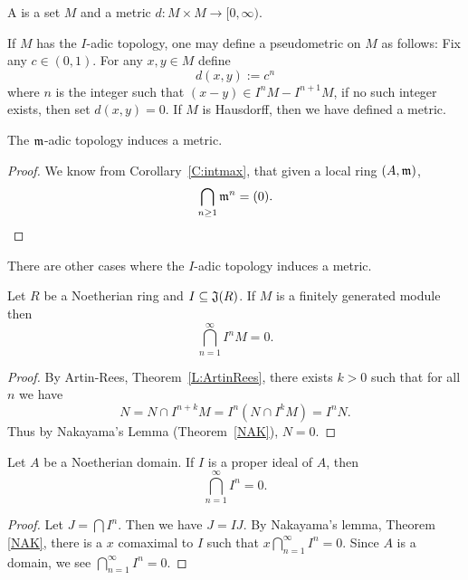 \documentclass{ximera}
\begin{document}
\begin{definition}
  A  is a set $M$ and a metric $d:M\times M \to
  [0,\infty)$.
\end{definition}

If $M$ has the $I$-adic topology, one may define a
pseudometric on $M$ as follows: Fix any $c\in
(0,1)$. For any $x,y\in M$ define
\[
d(x,y) := c^n
\]
where $n$ is the integer such that $(x-y)\in I^nM-I^{n+1}M$, if no
such integer exists, then set $d(x,y) = 0$. If $M$ is
Hausdorff, then we have defined a metric.


\begin{corollary}
  The $\mathfrak{m}$-adic topology induces a metric.
  \begin{proof}
    We know from Corollary~\ref{C:intmax}, that given a local ring $(A,\mathfrak{m})$,
    \[
    \bigcap_{n\ge 1} \mathfrak{m}^n  = (0).
    \]
  \end{proof}
\end{corollary}

There are other cases where the $I$-adic topology induces a metric.

\begin{corollary}
  Let $R$ be a Noetherian ring and $I \subseteq \mathfrak J(R)$. If $M$ is a
  finitely generated module then
  \[
  \bigcap_{n=1}^\infty I^n M = 0.
  \]
  \begin{proof}
    By Artin-Rees, Theorem~\ref{L:ArtinRees}, there
    exists $k > 0$ such that for all $n$ we have
    \[
    N = N \cap I^{n + k}M = I^n(N \cap I^kM) = I^nN.
    \]
    Thus by Nakayama's Lemma
    (Theorem~\ref{NAK}), $N = 0$.
  \end{proof}
\end{corollary}


\begin{corollary}
  Let $A$ be a Noetherian domain. If $I$ is a proper ideal of $A$,
  then
  \[
  \bigcap_{n=1}^\infty I^n = 0.
  \]
  \begin{proof}
    Let $J = \bigcap I^n$.  Then we have $J = I J$.  By Nakayama's
    lemma, Theorem \ref{NAK}, there is a $x$ comaximal to $I$ such
    that $x\bigcap_{n=1}^\infty I^n=0$.  Since $A$ is a domain, we see
    $\bigcap_{n=1}^\infty I^n=0$.
  \end{proof}
\end{corollary}
\end{document}
